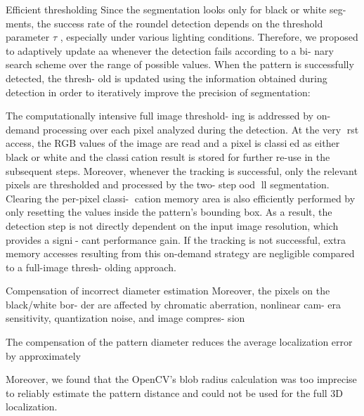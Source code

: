 \documentclass[a4paper]{report}
\begin{document}
Efficient thresholding
Since the segmentation looks only for black or white seg-
ments, the success rate of the roundel detection depends
on the threshold parameter $\tau$ , especially under various
lighting conditions. Therefore, we proposed to adaptively
update aa whenever the detection fails according to a bi-
nary search scheme over the range of possible values.
When the pattern is successfully detected, the thresh-
old is updated using the information obtained during
detection in order to iteratively improve the precision of segmentation:

The computationally intensive full image threshold-
ing is addressed by on-demand processing over each pixel
analyzed during the detection. At the very rst access,
the RGB values of the image are read and a pixel is
classied as either black or white and the classication
result is stored for further re-use in the subsequent steps.
Moreover, whenever the tracking is successful, only the
relevant pixels are thresholded and processed by the two-
step 
ood ll segmentation. Clearing the per-pixel classi-
cation memory area is also efficiently performed by only
resetting the values inside the pattern's bounding box.
As a result, the detection step is not directly dependent
on the input image resolution, which provides a signi-
cant performance gain. If the tracking is not successful,
extra memory accesses resulting from this on-demand
strategy are negligible compared to a full-image thresh-
olding approach.

Compensation of incorrect diameter estimation
Moreover, the pixels on the black/white bor-
der are affected by chromatic aberration, nonlinear cam-
era sensitivity, quantization noise, and image compres-
sion

The compensation of the
pattern diameter reduces the average localization error
by approximately

Moreover,
we found that the OpenCV's blob radius calculation was
too imprecise to reliably estimate the pattern distance
and could not be used for the full 3D localization.

 

\end{document}

